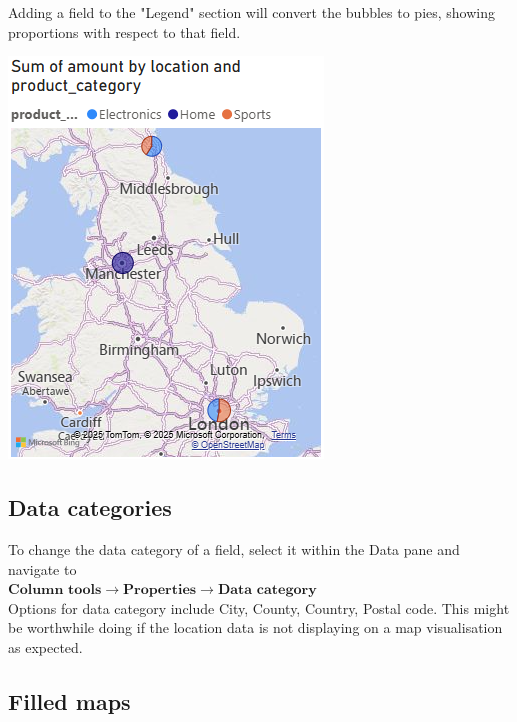 \documentclass[10pt, openany, twocolumn]{book}
\begin{document}
Adding a field to the "Legend" section will convert the bubbles to pies, showing proportions with respect to that field.

\begin{center}
\includegraphics[width=0.9\columnwidth]{images/map.png}
\end{center} 

\subsection*{Data categories}

To change the data category of a field, select it within the Data pane and navigate to\\

$\textbf{Column tools} \rightarrow \textbf{Properties} \rightarrow \textbf{Data category}$\\

Options for data category include City, County, Country, Postal code. This might be worthwhile doing if the location data is not displaying on a map visualisation as expected.

\subsection*{Filled maps}
\end{document}
